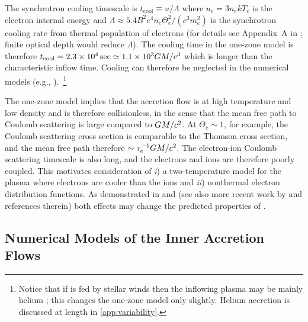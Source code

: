 The synchrotron cooling timescale is $t_\mathrm{cool} \equiv u/\Lambda$ where $u_e = 3 n_e k T_e$ is the electron internal energy and $\Lambda \approx 5.4 B^2 e^4 n_e \Theta_e^2 /(c^3 m_e^2)$ is the synchrotron cooling rate from thermal population of electrons (for details see Appendix~A in \citealt{2011ApJ...735....9M}; finite optical depth would reduce $\Lambda$). The cooling time in the one-zone model is therefore $t_\mathrm{cool}=2.3 \times 10^4\sec \simeq 1.1 \times 10^3 GM/c^3$ which is longer than the characteristic inflow time. Cooling can therefore be neglected in the numerical models (e.g., \citealt{2012MNRAS.426.1928D}).~\footnote{Notice that if \sgra is fed by stellar winds then the inflowing plasma may be mainly helium \citep{2019MNRAS.482L.123R}; this changes the one-zone model only slightly.  Helium accretion is discussed at length in \ref{app:variability}.}

The one-zone model implies that the accretion flow is at high temperature and low density and is therefore collisionless, in the sense that the mean free path to Coulomb scattering is large compared to $GM/c^2$. At $\Theta_e \sim 1$, for example, the Coulomb scattering cross section is comparable to the Thomson cross section, and the mean free path therefore $\sim \tau_e^{-1} GM/c^2$. The electron-ion Coulomb scattering timescale is also long, and the electrons and ions are therefore poorly coupled.  This motivates consideration of \emph{i}) a two-temperature model for the plasma where electrons are cooler than the ions \citep{1976ApJ...204..187S,1977ApJ...214..840I, 1982Natur.295...17R} and \emph{ii}) nonthermal electron distribution functions. As demonstrated in \citet{2000ApJ...541..234O} and \citet{2014A&A...570A...7M} (see also more recent work by \citealt{2018A&A...612A..34D} and references therein) both effects may change the predicted properties of \sgra.

\subsection{Numerical Models of the Inner Accretion Flows}

